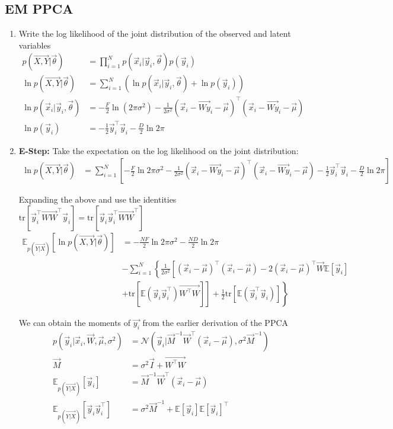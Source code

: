 \documentclass[12pt,twoside]{article}
\begin{document}
\subsection{EM PPCA}
\begin{enumerate}
\item Write the log likelihood of the joint distribution of the observed and latent variables
\begin{align*}
p(\vec{X,Y} \vert \vec{\theta}) &= \prod_{i=1}^N p(\vec{x}_i \vert\vec{y}_i, \vec{\theta})p(\vec{y}_i)\\
\ln p(\vec{X,Y} \vert \vec{\theta}) &= \sum_{i=1}^N \left(\ln p(\vec{x}_i \vert\vec{y}_i,\vec{\theta})+ \ln p(\vec{y}_i)\right)\\
\ln p(\vec{x}_i \vert \vec{y}_i, \vec{\theta}) &= -\frac{F}{2}\ln (2\pi\sigma^2) - \frac{1}{2\sigma^2}(\vec{x}_i-\vec{Wy}_i-\vec{\mu})^\top (\vec{x}_i-\vec{Wy}_i-\vec{\mu})\\
\ln p(\vec{y}_i)&= -\frac{1}{2}\vec{y}_i^\top \vec{y}_i-\frac{D}{2}\ln 2\pi
\end{align*}

\item \textbf{E-Step:} Take the expectation on the log likelihood on the joint distribution:
\begin{align*}
\ln p(\vec{X,Y} \vert \vec{\theta}) &=\sum_{i=1}^N\left[-\frac{F}{2}\ln 2\pi\sigma^2 -\frac{1}{2\sigma^2}(\vec{x}_i-\vec{Wy}_i-\vec{\mu})^\top (\vec{x}_i-\vec{Wy}_i-\vec{\mu}) -\frac{1}{2}\vec{y}_i^\top\vec{y}_i-\frac{D}{2}\ln 2\pi\right]
\end{align*}

Expanding the above and use the identities $\text{tr}\left[\vec{y}_i^\top \vec{WW}^\top \vec{y}_i\right]=\text{tr}\left[\vec{y}_i\vec{y}_i^\top \vec{WW}^\top \right]$
\begin{align*}
\mathbb{E}_{p(\vec{Y\vert X})} [\ln p(\vec{X,Y} \vert \vec{\theta})]
&=-\frac{NF}{2}\ln 2\pi\sigma^2 -\frac{ND}{2}\ln 2\pi\\
& -\sum_{i=1}^N\left\lbrace\frac{1}{2\sigma^2}\left[(\vec{x}_i-\vec{\mu})^\top (\vec{x}_i-\vec{\mu}) -2 (\vec{x}_i-\vec{\mu})^\top \vec{W} \mathbb{E}[\vec{y}_i] \right.\right.\\
&+\left.\left.\text{tr}\left[\mathbb{E}(\vec{y}_i\vec{y}_i^\top)\vec{W^\top W}\right]\right]+\frac{1}{2}\text{tr}\left[\mathbb{E}(\vec{y}_i^\top \vec{y}_i)\right]\right\rbrace
\end{align*}

We can obtain the moments of $\vec{y_i}$ from the earlier derivation of the PPCA
\begin{align*}
p(\vec{y}_i\vert \vec{x}_i, \vec{W}, \vec{\mu}, \sigma^2) & = \mathcal{N}(\vec{y}_i \vert \vec{M}^{-1}\vec{W}^\top(\vec{x}_i-\vec{\mu}), \sigma^2\vec{M}^{-1})\\
\vec{M}&=\sigma^2\vec{I} + \vec{W^\top W}\\
\mathbb{E}_{p(\vec{Y\vert X})}[\vec{y}_i]&=\vec{M}^{-1}\vec{W}^\top(\vec{x}_i-\vec{\mu})\\
\mathbb{E}_{p(\vec{Y\vert X})}[\vec{y}_i \vec{y}_i^\top]&=\sigma^2\vec{M}^{-1} +\mathbb{E}[\vec{y}_i]\mathbb{E}[\vec{y}_i]^\top
\end{align*}


\end{enumerate}
\end{document}

